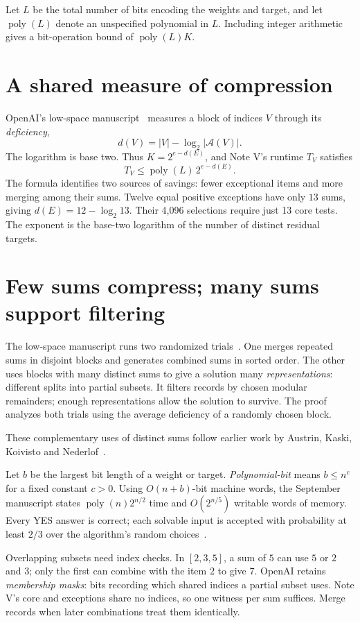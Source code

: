\documentclass[11pt,english]{article}
\newcommand{\poly}{\operatorname{poly}}
\begin{document}
Let $L$ be the total number of bits encoding the weights and target, and let
$\poly(L)$ denote an unspecified polynomial in $L$. Including integer arithmetic gives
a bit-operation bound of $\poly(L)K$.

\section{A shared measure of compression}
OpenAI's low-space manuscript~\cite{space} measures a block of indices $V$ through its
\emph{deficiency},
\[
 d(V)=|V|-\log_2|\mathcal A(V)|.
\]
The logarithm is base two. Thus $K=2^{e-d(E)}$, and Note V's runtime $T_V$ satisfies
\[
 \boxed{T_V\le\poly(L)\,2^{e-d(E)}.}
\]
The formula identifies two sources of savings: fewer exceptional items and
more merging among their sums. Twelve equal positive exceptions have only
$13$ sums, giving $d(E)=12-\log_2 13$. Their 4,096 selections require just
13 core tests. The exponent is the base-two logarithm of the number of
distinct residual targets.

\newpage
\section{Few sums compress; many sums support filtering}
The low-space manuscript runs two randomized trials~\cite{space}. One merges
repeated sums in disjoint blocks and generates combined sums in sorted order.
The other uses blocks with many distinct sums to give a solution many
\emph{representations}: different splits into partial subsets. It filters
records by chosen modular remainders; enough
representations allow the solution to survive. The proof analyzes both trials
using the average deficiency of a randomly chosen block.

These complementary uses of distinct sums follow earlier work by Austrin,
Kaski, Koivisto and Nederlof~\cite{akkn}.

Let $b$ be the largest bit length of a weight or target.
\emph{Polynomial-bit} means $b\le n^c$ for a fixed constant $c>0$.
Using $O(n+b)$-bit machine words, the September manuscript states
$\poly(n)2^{n/2}$ time and $O(2^{n/5})$ writable words of memory.
Every YES answer is correct; each solvable input is accepted with probability
at least $2/3$ over the algorithm's random choices~\cite{space}.

Overlapping subsets need index checks. In $[2,3,5]$, a sum of $5$ can use
$5$ or $2$ and $3$; only the first can combine with the item $2$ to give $7$.
OpenAI retains \emph{membership masks}: bits recording which shared indices
a partial subset uses. Note V's core and exceptions share no indices, so
one witness per sum suffices. Merge records when later combinations treat
them identically.
\end{document}
